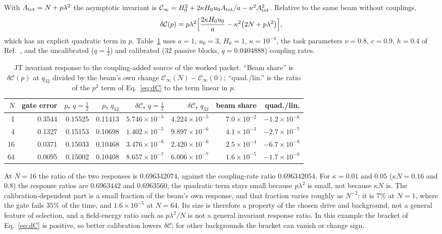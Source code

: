 \documentclass[12pt,a4paper]{article}
\begin{document}
With $A_{\rm tot}=N+p\lambda^2$ the asymptotic invariant is $\mathcal C_\infty=H_0^2+2\kappa H_0u_0A_{\rm tot}/a-\kappa^2A_{\rm tot}^2$. Relative to the same beam without couplings,
\begin{equation}
\delta\mathcal C(p)=p\lambda^2\Bigl[\frac{2\kappa H_0u_0}a-\kappa^2\bigl(2N+p\lambda^2\bigr)\Bigr],
\label{eq:dC}
\end{equation}
which has an explicit quadratic term in $p$. Table~\ref{tab:response} uses $a=1$, $u_0=3$, $H_0=1$, $\kappa=10^{-4}$, the task parameters $\nu=0.8$, $c=0.9$, $h=0.4$ of Ref.~\cite{Liu2026QRAIFB}, and the uncalibrated ($q=\tfrac12$) and calibrated ($32$ passive blocks, $q=0.0404888$) coupling rates.

\begin{table}[ht]
\centering
\footnotesize
\setlength{\tabcolsep}{4pt}
\begin{tabular}{@{}rrrrrrrr@{}}
\toprule
$N$ & gate error & $p$, $q=\tfrac12$ & $p$, $q_{32}$ & $\delta\mathcal C$, $q=\tfrac12$ & $\delta\mathcal C$, $q_{32}$ & beam share & quad./lin.\\
\midrule
1 & 0.3544 & 0.15525 & 0.11413 & $5.746\times10^{-5}$ & $4.224\times10^{-5}$ & $7.0\times10^{-2}$ & $-1.2\times10^{-6}$\\
4 & 0.1327 & 0.15153 & 0.10698 & $1.402\times10^{-5}$ & $9.897\times10^{-6}$ & $4.1\times10^{-3}$ & $-2.7\times10^{-7}$\\
16 & 0.0371 & 0.15033 & 0.10468 & $3.476\times10^{-6}$ & $2.420\times10^{-6}$ & $2.5\times10^{-4}$ & $-6.7\times10^{-8}$\\
64 & 0.0095 & 0.15002 & 0.10408 & $8.657\times10^{-7}$ & $6.006\times10^{-7}$ & $1.6\times10^{-5}$ & $-1.7\times10^{-8}$\\
\bottomrule
\end{tabular}
\caption{JT invariant response to the coupling-added source of the worked packet. ``Beam share'' is $\delta\mathcal C(p)$ at $q_{32}$ divided by the beam's own change $\mathcal C_\infty(N)-\mathcal C_\infty(0)$; ``quad./lin.'' is the ratio of the $p^2$ term of Eq.~\eqref{eq:dC} to the term linear in $p$.}
\label{tab:response}
\end{table}

At $N=16$ the ratio of the two responses is $0.696342074$, against the coupling-rate ratio $0.696342054$. For $\kappa=0.01$ and $0.05$ ($\kappa N=0.16$ and $0.8$) the response ratios are $0.6963442$ and $0.6963560$; the quadratic term stays small because $p\lambda^2$ is small, not because $\kappa N$ is. The calibration-dependent part is a small fraction of the beam's own response, and that fraction varies roughly as $N^{-2}$: it is $7\%$ at $N=1$, where the gate fails $35\%$ of the time, and $1.6\times10^{-5}$ at $N=64$. Its size is therefore a property of the chosen drive and background, not a general feature of selection, and a field-energy ratio such as $p\lambda^2/N$ is not a general invariant response ratio. In this example the bracket of Eq.~\eqref{eq:dC} is positive, so better calibration lowers $\delta\mathcal C$; for other backgrounds the bracket can vanish or change sign.
\end{document}
